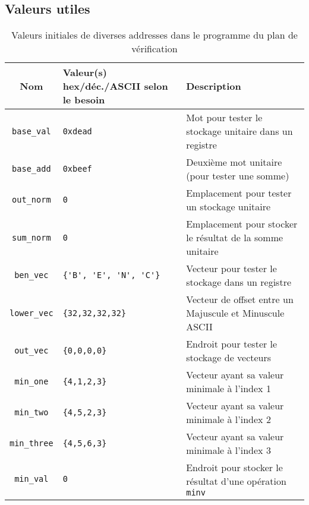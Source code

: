 \documentclass[a11paper]{article}
\begin{document}
\begin{appendices}
\section{Valeurs utiles}

\begin{table}[H]
	\centering
	\footnotesize
	\caption{Valeurs initiales de diverses addresses dans le programme du plan de vérification}
	\label{tab:data}
	\begin{tabular}{@{}cp{5.5cm}l@{}}
		\toprule
    \textbf{Nom} &
    \textbf{Valeur(s)} hex/déc./ASCII selon le besoin &
    \textbf{Description} \\
		\midrule

    \verb|base_val|  & \verb|0xdead|               & Mot pour tester le stockage unitaire dans un registre        \\
    \verb|base_add|  & \verb|0xbeef|               & Deuxième mot unitaire (pour tester une somme)                \\
		\verb|out_norm|  & \verb|0|                    & Emplacement pour tester un stockage unitaire                 \\
		\verb|sum_norm|  & \verb|0|                    & Emplacement pour stocker le résultat de la somme unitaire    \\
		\verb|ben_vec|   & \verb|{'B', 'E', 'N', 'C'}| & Vecteur pour tester le stockage dans un registre             \\
		\verb|lower_vec| & \verb|{32,32,32,32}|        & Vecteur de offset entre un Majuscule et Minuscule ASCII      \\
		\verb|out_vec|   & \verb|{0,0,0,0}|            & Endroit pour tester le stockage de vecteurs                  \\
    \verb|min_one|   & \verb|{4,1,2,3}|            & Vecteur ayant sa valeur minimale à l'index 1 \\
    \verb|min_two|   & \verb|{4,5,2,3}|            & Vecteur ayant sa valeur minimale à l'index 2 \\
    \verb|min_three| & \verb|{4,5,6,3}|            & Vecteur ayant sa valeur minimale à l'index 3 \\
		\verb|min_val|   & \verb|0|                    & Endroit pour stocker le résultat d'une opération \verb|minv| \\

		\bottomrule
	\end{tabular}
\end{table}


\end{appendices}
\end{document}
